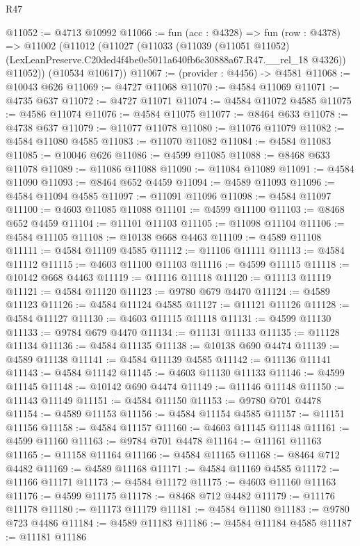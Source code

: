 \begin{lexlean}{R47}
\begin{coremodule}
@11052 := @4713 @10992
@11066 := fun (acc : @4328) =>
  fun (row : @4378) =>
  @11002
    (@11012
      (@11027
        (@11033
          (@11039
            (@11051 @11052)
            (LexLeanPreserve.C20ded4f4be0e5011a640fb6c30888a67.R47.__rel_18 @4326))
          @11052))
      (@10534 @10617))
@11067 := (provider : @4456) -> @4581
@11068 := @10043 @626
@11069 := @4727 @11068
@11070 := @4584 @11069
@11071 := @4735 @637
@11072 := @4727 @11071
@11074 := @4584 @11072 @4585
@11075 := @4586 @11074
@11076 := @4584 @11075
@11077 := @8464 @633
@11078 := @4738 @637
@11079 := @11077 @11078
@11080 := @11076 @11079
@11082 := @4584 @11080 @4585
@11083 := @11070 @11082
@11084 := @4584 @11083
@11085 := @10046 @626
@11086 := @4599 @11085
@11088 := @8468 @633 @11078
@11089 := @11086 @11088
@11090 := @11084 @11089
@11091 := @4584 @11090
@11093 := @8464 @652 @4459
@11094 := @4589 @11093
@11096 := @4584 @11094 @4585
@11097 := @11091 @11096
@11098 := @4584 @11097
@11100 := @4603 @11085 @11088
@11101 := @4599 @11100
@11103 := @8468 @652 @4459
@11104 := @11101 @11103
@11105 := @11098 @11104
@11106 := @4584 @11105
@11108 := @10138 @668 @4463
@11109 := @4589 @11108
@11111 := @4584 @11109 @4585
@11112 := @11106 @11111
@11113 := @4584 @11112
@11115 := @4603 @11100 @11103
@11116 := @4599 @11115
@11118 := @10142 @668 @4463
@11119 := @11116 @11118
@11120 := @11113 @11119
@11121 := @4584 @11120
@11123 := @9780 @679 @4470
@11124 := @4589 @11123
@11126 := @4584 @11124 @4585
@11127 := @11121 @11126
@11128 := @4584 @11127
@11130 := @4603 @11115 @11118
@11131 := @4599 @11130
@11133 := @9784 @679 @4470
@11134 := @11131 @11133
@11135 := @11128 @11134
@11136 := @4584 @11135
@11138 := @10138 @690 @4474
@11139 := @4589 @11138
@11141 := @4584 @11139 @4585
@11142 := @11136 @11141
@11143 := @4584 @11142
@11145 := @4603 @11130 @11133
@11146 := @4599 @11145
@11148 := @10142 @690 @4474
@11149 := @11146 @11148
@11150 := @11143 @11149
@11151 := @4584 @11150
@11153 := @9780 @701 @4478
@11154 := @4589 @11153
@11156 := @4584 @11154 @4585
@11157 := @11151 @11156
@11158 := @4584 @11157
@11160 := @4603 @11145 @11148
@11161 := @4599 @11160
@11163 := @9784 @701 @4478
@11164 := @11161 @11163
@11165 := @11158 @11164
@11166 := @4584 @11165
@11168 := @8464 @712 @4482
@11169 := @4589 @11168
@11171 := @4584 @11169 @4585
@11172 := @11166 @11171
@11173 := @4584 @11172
@11175 := @4603 @11160 @11163
@11176 := @4599 @11175
@11178 := @8468 @712 @4482
@11179 := @11176 @11178
@11180 := @11173 @11179
@11181 := @4584 @11180
@11183 := @9780 @723 @4486
@11184 := @4589 @11183
@11186 := @4584 @11184 @4585
@11187 := @11181 @11186

\end{coremodule}
\end{lexlean}

